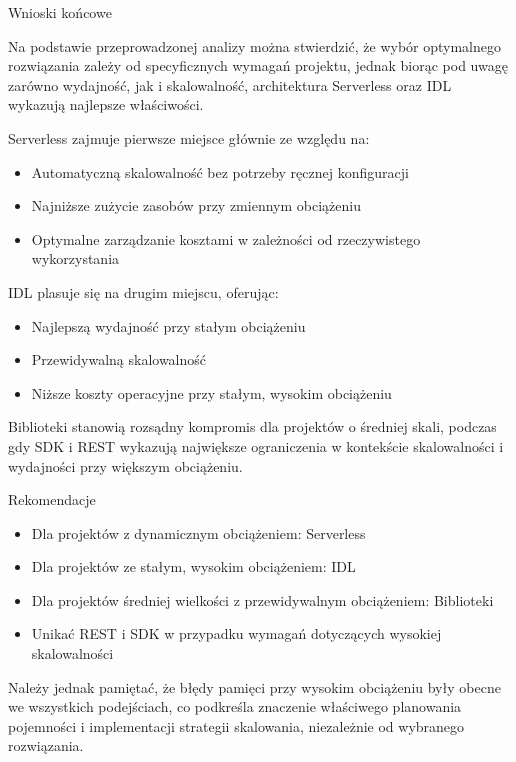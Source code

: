 \documentclass[runningheads,12pt]{llncs}
\begin{document}
Wnioski końcowe

Na podstawie przeprowadzonej analizy można stwierdzić, że wybór optymalnego rozwiązania zależy od specyficznych wymagań projektu, jednak biorąc pod uwagę zarówno wydajność, jak i skalowalność, architektura Serverless oraz IDL wykazują najlepsze właściwości.

Serverless zajmuje pierwsze miejsce głównie ze względu na:
\begin{itemize}
    \item Automatyczną skalowalność bez potrzeby ręcznej konfiguracji
    \item Najniższe zużycie zasobów przy zmiennym obciążeniu
    \item Optymalne zarządzanie kosztami w zależności od rzeczywistego wykorzystania
\end{itemize}

IDL plasuje się na drugim miejscu, oferując:
\begin{itemize}
    \item Najlepszą wydajność przy stałym obciążeniu
    \item Przewidywalną skalowalność
    \item Niższe koszty operacyjne przy stałym, wysokim obciążeniu
\end{itemize}

Biblioteki stanowią rozsądny kompromis dla projektów o średniej skali, podczas gdy SDK i REST wykazują największe ograniczenia w kontekście skalowalności i wydajności przy większym obciążeniu.

Rekomendacje

\begin{itemize}
    \item Dla projektów z dynamicznym obciążeniem: Serverless
    \item Dla projektów ze stałym, wysokim obciążeniem: IDL
    \item Dla projektów średniej wielkości z przewidywalnym obciążeniem: Biblioteki
    \item Unikać REST i SDK w przypadku wymagań dotyczących wysokiej skalowalności
\end{itemize}

Należy jednak pamiętać, że błędy pamięci przy wysokim obciążeniu były obecne we wszystkich podejściach, co podkreśla znaczenie właściwego planowania pojemności i implementacji strategii skalowania, niezależnie od wybranego rozwiązania.

\end{document}
